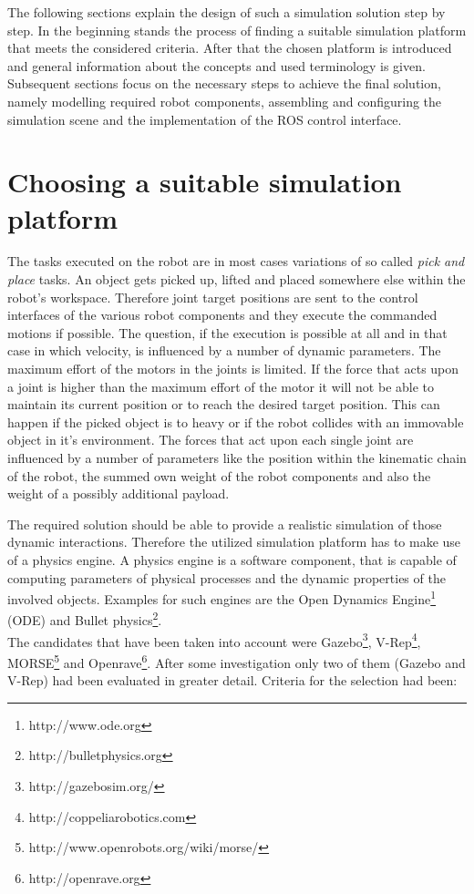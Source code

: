 The following sections explain the design of such a simulation solution step by step. In the beginning stands the process of finding a suitable simulation platform that meets the considered criteria. After that the chosen platform is introduced and general information about the concepts and used terminology is given. Subsequent sections focus on the necessary steps to achieve the final solution, namely modelling required robot components, assembling and configuring the simulation scene and the implementation of the ROS control interface.

\section{Choosing a suitable simulation platform}

The tasks executed on the robot are in most cases variations of so called \emph{pick and place} tasks. An object gets picked up, lifted and placed somewhere else within the robot's workspace. Therefore joint target positions are sent to the control interfaces of the various robot components and they execute the commanded motions if possible. The question, if the execution is possible at all and in that case in which velocity, is influenced by a number of dynamic parameters. The maximum effort of the motors in the joints is limited. If the force that acts upon a joint is higher than the maximum effort of the motor it will not be able to maintain its current position or to reach the desired target position. This can happen if the picked object is to heavy or if the robot collides with an immovable object in it's environment. The forces that act upon each single joint are influenced by a number of parameters like the position within the kinematic chain of the robot, the summed own weight of the robot components and also the weight of a possibly additional payload.

The required solution should be able to provide a realistic simulation of those dynamic interactions. Therefore the utilized simulation platform has to make use of a physics engine. A physics engine is a software component, that is capable of computing parameters of physical processes and the dynamic properties of the involved objects. Examples for such engines are the Open Dynamics Engine\footnote{http://www.ode.org} (ODE) and Bullet physics\footnote{http://bulletphysics.org}. \\

The candidates that have been taken into account were Gazebo\footnote{http://gazebosim.org/}, V-Rep\footnote{http://coppeliarobotics.com}, MORSE\footnote{http://www.openrobots.org/wiki/morse/} and Openrave\footnote{http://openrave.org}. After some investigation only two of them (Gazebo and V-Rep) had been evaluated in greater detail. Criteria for the selection had been:

